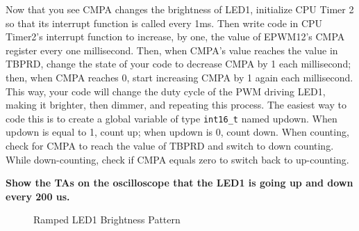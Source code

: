 \documentclass[11pt]{article}
\begin{document}
Now that you see CMPA changes the brightness of LED1, initialize CPU Timer 2 so that its interrupt function is called every 1ms. Then write code in CPU Timer2’s interrupt function to increase, by one, the value of EPWM12’s CMPA register every one millisecond. Then, when CMPA’s value reaches the value in TBPRD, change the state of your code to decrease CMPA by 1 each millisecond; then, when CMPA reaches 0, start increasing CMPA by 1 again each millisecond. This way, your code will change the duty cycle of the PWM driving LED1, making it brighter, then dimmer, and repeating this process. The easiest way to code this is to create a global variable of type \texttt{int16_t} named updown. When updown is equal to 1, count up; when updown is 0, count down. When counting, check for CMPA to reach the value of TBPRD and switch to down counting. While down-counting, check if CMPA equals zero to switch back to up-counting.

\textbf{Show the TAs on the oscilloscope that the LED1 is going up and down every 200 us.}
%
\begin{figure}[H]
    \centering
    \AltEnd
    \caption{Ramped LED1 Brightness Pattern}
\end{figure}
%
\end{document}
